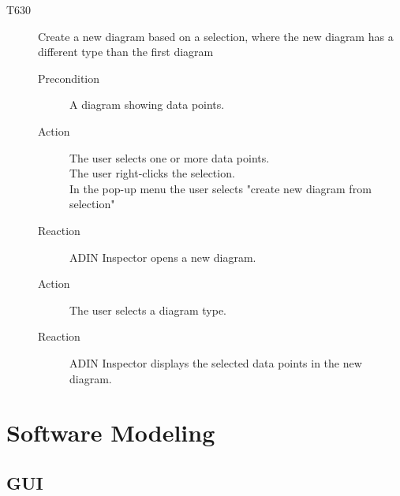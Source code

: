 \documentclass[twoside, english, draft]{Pflichtenheft}
\begin{document}
\begin{description}
	\item[T630] Create a new diagram based on a selection, where the new diagram has a different type than the first diagram
	      \begin{description}
		      \item[Precondition]
			    A diagram showing data points.
		      \item[Action]
		            The user selects one or more data points. \\
		            The user right-clicks the selection. \\
			    In the pop-up menu the user selects "create new diagram from selection"
				
		      \item[Reaction]
			    ADIN Inspector opens a new diagram.
		      \item[Action]
		            The user selects a diagram type.
		      \item[Reaction]
		            ADIN Inspector displays the selected data points in the new diagram.
	      \end{description}


\end{description}

\section{Software Modeling}



\subsection{GUI}

\end{document}
